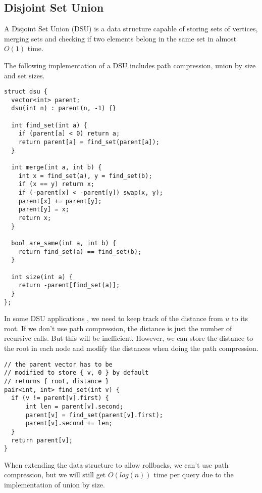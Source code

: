 \subsection{Disjoint Set Union}

A Disjoint Set Union (DSU) is a data structure capable of storing sets of vertices,
merging sets and checking if two elements belong in the same set in almost $O(1)$ time.
\cite{DSUCPAlgo}
\newline

\begin{center}
\begin{minipage}[t]{0.45\linewidth}
The following implementation of a DSU includes path compression, union by size and set sizes.
\begin{lstlisting}
struct dsu {
  vector<int> parent;
  dsu(int n) : parent(n, -1) {}

  int find_set(int a) {
    if (parent[a] < 0) return a;
    return parent[a] = find_set(parent[a]);
  }

  int merge(int a, int b) {
    int x = find_set(a), y = find_set(b);
    if (x == y) return x;
    if (-parent[x] < -parent[y]) swap(x, y);
    parent[x] += parent[y];
    parent[y] = x;
    return x;
  }

  bool are_same(int a, int b) {
    return find_set(a) == find_set(b);
  }

  int size(int a) {
    return -parent[find_set(a)];
  }
};
\end{lstlisting}

In some DSU applications \cite{DSUCPAlgo}, we need to keep track of the distance from $u$
to its root. If we don't use path compression, the distance is just the number
of recursive calls. But this will be inefficient. However, we can store
the distance to the root in each node and modify the distances when doing the path compression.

\begin{lstlisting}
// the parent vector has to be 
// modified to store { v, 0 } by default
// returns { root, distance }
pair<int, int> find_set(int v) {
  if (v != parent[v].first) {
      int len = parent[v].second;
      parent[v] = find_set(parent[v].first);
      parent[v].second += len;
  }
  return parent[v];
}
\end{lstlisting}

\end{minipage}
\qquad
\begin{minipage}[t]{0.45\linewidth}
When extending the data structure to allow rollbacks,
we can't use path compression, but we will still get $O(log(n))$
time per query due to the implementation of union by size.


\end{minipage}
\end{center}
